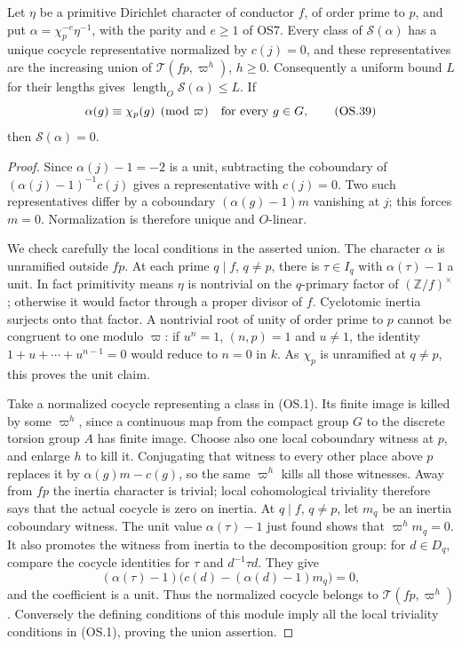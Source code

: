 \begin{proposition}
Let $\eta$ be a primitive Dirichlet character of conductor $f$,
of order prime to $p$, and put $\alpha=\chi_p^{-e}\eta^{-1}$,
with the parity and $e\ge1$ of OS7.
Every class of $\mathscr S(\alpha)$ has a unique cocycle representative
normalized by $c(j)=0$, and these representatives are the increasing
union of $\mathcal T(fp,\varpi^h)$, $h\ge0$.
Consequently a uniform bound $L$ for their lengths gives
$\operatorname{length}_O\mathscr S(\alpha)\le L$.
If
\[
                   \alpha(g)\equiv\chi_p(g)\pmod\varpi
                      \quad\hbox{for every }g\in G,
 \tag{OS.39}
\]
then $\mathscr S(\alpha)=0$.
\end{proposition}
\begin{proof}
Since $\alpha(j)-1=-2$ is a unit, subtracting the coboundary of
$(\alpha(j)-1)^{-1}c(j)$ gives a representative with $c(j)=0$.
Two such representatives differ by a coboundary
$(\alpha(g)-1)m$ vanishing at $j$; this forces $m=0$.
Normalization is therefore unique and $O$-linear.

We check carefully the local conditions in the asserted union.
The character $\alpha$ is unramified outside $fp$.
At each prime $q\mid f$, $q\ne p$, there is
$\tau\in I_q$ with $\alpha(\tau)-1$ a unit.
In fact primitivity means $\eta$ is nontrivial on the $q$-primary
factor of $(\mathbb Z/f)^\times$; otherwise it would factor
through a proper divisor of $f$.  Cyclotomic inertia surjects onto
that factor.  A nontrivial root of unity of order prime to $p$
cannot be congruent to one modulo $\varpi$: if $u^n=1$,
$(n,p)=1$ and $u\ne1$, the identity
$1+u+\cdots+u^{n-1}=0$ would reduce to $n=0$ in $k$.
As $\chi_p$ is unramified at $q\ne p$, this proves the unit claim.

Take a normalized cocycle representing a class in (OS.1).
Its finite image is killed by some $\varpi^h$, since a continuous
map from the compact group $G$ to the discrete torsion group $A$
has finite image.  Choose also one local coboundary witness at
$p$, and enlarge $h$ to kill it.
Conjugating that witness to every other place above $p$ replaces
it by $\alpha(g)m-c(g)$, so the same $\varpi^h$ kills all those
witnesses.
Away from $fp$ the inertia character is trivial; local cohomological
triviality therefore says that the actual cocycle is zero on inertia.
At $q\mid f$, $q\ne p$, let $m_q$ be an inertia coboundary
witness.  The unit value $\alpha(\tau)-1$ just found shows that
$\varpi^h m_q=0$.  It also promotes the witness from inertia to
the decomposition group: for $d\in D_q$, compare the cocycle
identities for $\tau$ and $d^{-1}\tau d$.
They give
\[
  (\alpha(\tau)-1)
       \bigl(c(d)-(\alpha(d)-1)m_q\bigr)=0,
\]
and the coefficient is a unit.  Thus the normalized cocycle belongs
to $\mathcal T(fp,\varpi^h)$.
Conversely the defining conditions of this module imply all the
local triviality conditions in (OS.1), proving the union assertion.


\end{proof}
